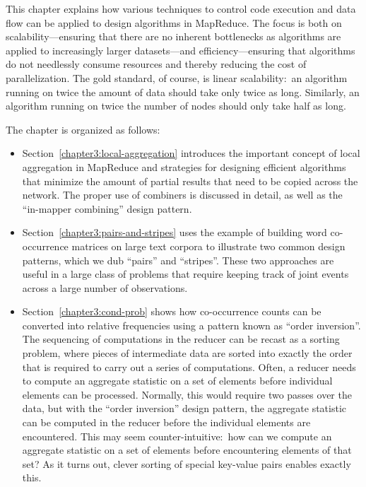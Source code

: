 This chapter explains how various techniques to control code execution
and data flow can be applied to design algorithms in MapReduce.  The
focus is both on scalability---ensuring that there are no inherent
bottlenecks as algorithms are applied to increasingly larger
datasets---and efficiency---ensuring that algorithms do not needlessly
consume resources and thereby reducing the cost of parallelization.
The gold standard, of course, is linear scalability:\ an algorithm
running on twice the amount of data should take only twice as long.
Similarly, an algorithm running on twice the number of nodes should
only take half as long.  

The chapter is organized as follows:

\begin{itemize}

\item Section~\ref{chapter3:local-aggregation} introduces the
  important concept of local aggregation in MapReduce and strategies
  for designing efficient algorithms that minimize the amount of
  partial results that need to be copied across the network.  The
  proper use of combiners is discussed in detail, as well as the
  ``in-mapper combining'' design pattern.

\item Section~\ref{chapter3:pairs-and-stripes} uses the example of
  building word co-occurrence matrices on large text corpora to
  illustrate two common design patterns, which we dub ``pairs'' and
  ``stripes''.  These two approaches are useful in a large class of
  problems that require keeping track of joint events across a large
  number of observations.

\item Section~\ref{chapter3:cond-prob} shows how co-occurrence counts
  can be converted into relative frequencies using a pattern known as
  ``order inversion''.  The sequencing of computations in the reducer
  can be recast as a sorting problem, where pieces of intermediate
  data are sorted into exactly the order that is required to carry out
  a series of computations.  Often, a reducer needs to compute an
  aggregate statistic on a set of elements before individual elements
  can be processed.  Normally, this would require two passes over the
  data, but with the ``order inversion'' design pattern, the aggregate
  statistic can be computed in the reducer before the individual
  elements are encountered.  This may seem counter-intuitive:\ how can
  we compute an aggregate statistic on a set of elements before
  encountering elements of that set?  As it turns out, clever sorting
  of special key-value pairs enables exactly this.


\end{itemize}
